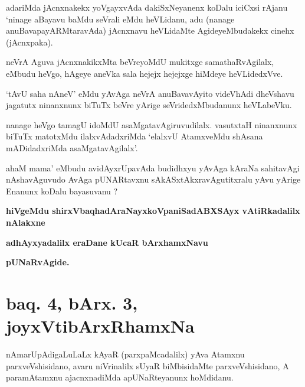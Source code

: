 \begin{artha}
adariMda jAcnxnakekx yoVgayxvAda dakiSxNeyanenx koDalu iciCxsi rAjanu `ninage aBayavu baMdu seVrali eMdu heVLidanu, adu (nanage anuBavapayARMtaravAda) jAcnxnavu heVLidaMte AgideyeMbudakekx cinehx (jAcnxpaka).
\end{artha}


\begin{artha}
neVrA Aguva jAcnxnakikxMta beVreyoMdU mukitxge samathaRvAgilalx, eMbudu heVgo, hAgeye aneVka sala hejejx hejejxge hiMdeye heVLidedxVve.
\end{artha}


\begin{artha}
`tAvU saha nAneV' eMdu yAvAga neVrA anuBavavAyito videVhAdi dheVshavu jagatutx ninanxnunx biTuTx beVre yArige seVridedxMbudanunx heVLabeVku.
\end{artha}


\begin{artha}
nanage heVgo tamagU idoMdU asaMgatavAgiruvudilalx. vasutxtaH ninanxnunx biTuTx matotxMdu ilalxvAdadxriMda `elalxvU AtamxveMdu shAsana mADidadxriMda asaMgatavAgilalx'.
\end{artha}

\begin{artha}
ahaM mama' eMbudu avidAyxrUpavAda budidhxyu yAvAga kAraNa sahitavAgi nAshavAguvudo AvAga pUNARtavxnu sAkASxtAkxravAgutitxralu yAvu yArige Enanunx koDalu bayasuvanu ?
\end{artha}

\begin{center}
{\bf hiVgeMdu shirxVbaqhadAraNayxkoVpaniSadABXSAyx vAtiRkadalilx nAlakxne}

\smallskip
{\bf adhAyxyadalilx eraDane kUcaR bArxhamxNavu}

\smallskip
{\bf pUNaRvAgide.}
\end{center}

\section*{baq. 4, bArx. 3, joyxVtibArxRhamxNa}


\begin{artha}
nAmarUpAdigaLuLaLx kAyaR (parxpaMcadalilx) yAva Atamxnu parxveVshisidano, avaru niVrinalilx sUyaR biMbisidaMte parxveVshisidano, A paramAtamxnu ajacnxnadiMda apUNaRteyanunx hoMdidanu.
\end{artha}

